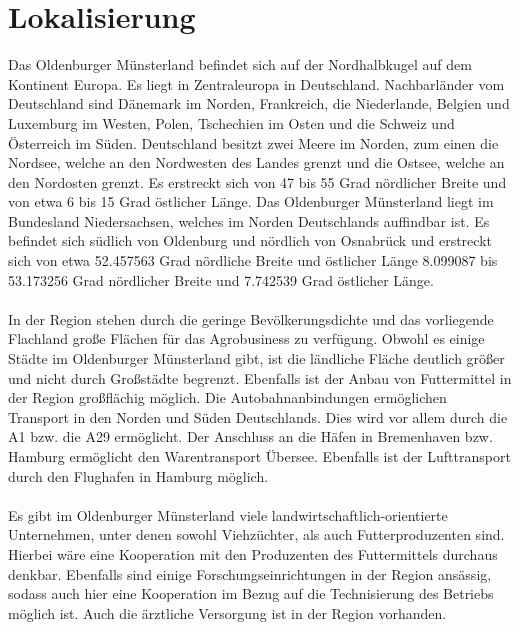 \documentclass[a4paper, 12pt]{report}
\begin{document}
	\bsremovechaptertitle
	\chapter{Lokalisierung}
	
	Das Oldenburger Münsterland befindet sich auf der Nordhalbkugel auf dem Kontinent Europa.
	Es liegt in Zentraleuropa in Deutschland.
	Nachbarländer vom Deutschland sind Dänemark im Norden, Frankreich, die Niederlande, Belgien und Luxemburg im Westen, Polen, Tschechien im Osten und die Schweiz und Österreich im Süden.
	Deutschland besitzt zwei Meere im Norden, zum einen die Nordsee, welche an den Nordwesten des Landes grenzt und die Ostsee, welche an den Nordosten grenzt.
	Es erstreckt sich von 47 bis 55 Grad nördlicher Breite und von etwa 6 bis 15 Grad östlicher Länge.
	Das Oldenburger Münsterland liegt im Bundesland Niedersachsen, welches im Norden Deutschlands auffindbar ist.
	Es befindet sich südlich von Oldenburg und nördlich von Osnabrück und erstreckt sich von etwa 52.457563 Grad nördliche Breite und östlicher Länge 8.099087 bis 53.173256 Grad nördlicher Breite und 7.742539 Grad östlicher Länge.
	\\\\
	In der Region stehen durch die geringe Bevölkerungsdichte und das vorliegende Flachland große Flächen für das Agrobusiness zu verfügung.
	Obwohl es einige Städte im Oldenburger Münsterland gibt, ist die ländliche Fläche deutlich größer und nicht durch Großstädte begrenzt.
	Ebenfalls ist der Anbau von Futtermittel in der Region großflächig möglich.
	Die Autobahnanbindungen ermöglichen Transport in den Norden und Süden Deutschlands.
	Dies wird vor allem durch die A1 bzw. die A29 ermöglicht.
	Der Anschluss an die Häfen in Bremenhaven bzw. Hamburg ermöglicht den Warentransport Übersee.
	Ebenfalls ist der Lufttransport durch den Flughafen in Hamburg möglich.
	\\\\
	Es gibt im Oldenburger Münsterland viele landwirtschaftlich-orientierte Unternehmen, unter denen sowohl Viehzüchter, als auch Futterproduzenten sind. 
	Hierbei wäre eine Kooperation mit den Produzenten des Futtermittels durchaus denkbar.
	Ebenfalls sind einige Forschungseinrichtungen in der Region ansässig, sodass auch hier eine Kooperation im Bezug auf die Technisierung des Betriebs möglich ist.
	Auch die ärztliche Versorgung ist in der Region vorhanden.
	
	
	
	
\end{document}
